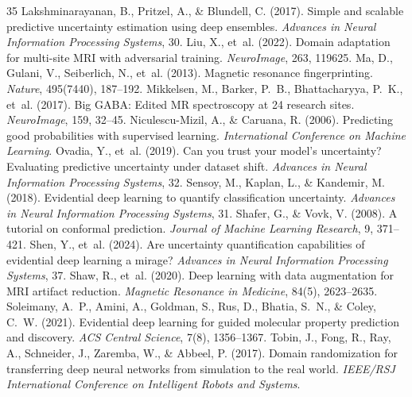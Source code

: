 \documentclass[11pt,a4paper]{article}
\begin{document}
\begin{thebibliography}{35}
 Lakshminarayanan, B., Pritzel, A., \& Blundell, C. (2017). Simple and scalable predictive uncertainty estimation using deep ensembles. \emph{Advances in Neural Information Processing Systems}, 30.
 Liu, X., et~al. (2022). Domain adaptation for multi-site MRI with adversarial training. \emph{NeuroImage}, 263, 119625.
 Ma, D., Gulani, V., Seiberlich, N., et~al. (2013). Magnetic resonance fingerprinting. \emph{Nature}, 495(7440), 187--192.
 Mikkelsen, M., Barker, P.~B., Bhattacharyya, P.~K., et~al. (2017). Big GABA: Edited MR spectroscopy at 24 research sites. \emph{NeuroImage}, 159, 32--45.
 Niculescu-Mizil, A., \& Caruana, R. (2006). Predicting good probabilities with supervised learning. \emph{International Conference on Machine Learning}.
 Ovadia, Y., et~al. (2019). Can you trust your model's uncertainty? Evaluating predictive uncertainty under dataset shift. \emph{Advances in Neural Information Processing Systems}, 32.
 Sensoy, M., Kaplan, L., \& Kandemir, M. (2018). Evidential deep learning to quantify classification uncertainty. \emph{Advances in Neural Information Processing Systems}, 31.
 Shafer, G., \& Vovk, V. (2008). A tutorial on conformal prediction. \emph{Journal of Machine Learning Research}, 9, 371--421.
 Shen, Y., et~al. (2024). Are uncertainty quantification capabilities of evidential deep learning a mirage? \emph{Advances in Neural Information Processing Systems}, 37.
 Shaw, R., et~al. (2020). Deep learning with data augmentation for MRI artifact reduction. \emph{Magnetic Resonance in Medicine}, 84(5), 2623--2635.
 Soleimany, A.~P., Amini, A., Goldman, S., Rus, D., Bhatia, S.~N., \& Coley, C.~W. (2021). Evidential deep learning for guided molecular property prediction and discovery. \emph{ACS Central Science}, 7(8), 1356--1367.
 Tobin, J., Fong, R., Ray, A., Schneider, J., Zaremba, W., \& Abbeel, P. (2017). Domain randomization for transferring deep neural networks from simulation to the real world. \emph{IEEE/RSJ International Conference on Intelligent Robots and Systems}.

\end{thebibliography}
\end{document}
